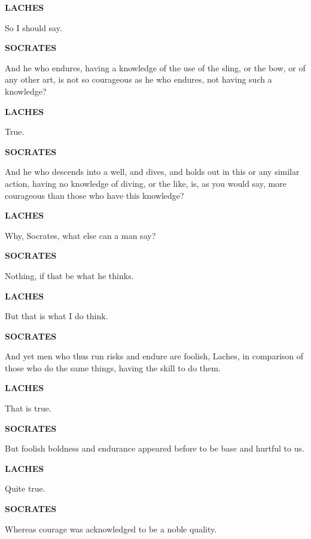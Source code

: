 \documentclass[11pt,letter]{book}
\begin{document}
\par \textbf{LACHES}
\par   So I should say.

\par \textbf{SOCRATES}
\par   And he who endures, having a knowledge of the use of the sling, or the bow, or of any other art, is not so courageous as he who endures, not having such a knowledge?

\par \textbf{LACHES}
\par   True.

\par \textbf{SOCRATES}
\par   And he who descends into a well, and dives, and holds out in this or any similar action, having no knowledge of diving, or the like, is, as you would say, more courageous than those who have this knowledge?

\par \textbf{LACHES}
\par   Why, Socrates, what else can a man say?

\par \textbf{SOCRATES}
\par   Nothing, if that be what he thinks.

\par \textbf{LACHES}
\par   But that is what I do think.

\par \textbf{SOCRATES}
\par   And yet men who thus run risks and endure are foolish, Laches, in comparison of those who do the same things, having the skill to do them.

\par \textbf{LACHES}
\par   That is true.

\par \textbf{SOCRATES}
\par   But foolish boldness and endurance appeared before to be base and hurtful to us.

\par \textbf{LACHES}
\par   Quite true.

\par \textbf{SOCRATES}
\par   Whereas courage was acknowledged to be a noble quality.
\end{document}
